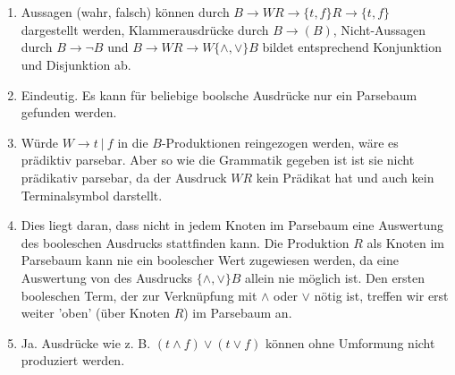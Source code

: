 \documentclass[a4paper,10pt]{scrartcl}
\begin{document}
\section{}
\begin{enumerate}
\item   Aussagen (wahr, falsch) können durch $B \to WR \to \{t,f\}R \to \{t,f\}$ dargestellt werden, Klammerausdrücke durch $B \to (B)$, Nicht-Aussagen durch $B \to \neg B$ und $B \to WR \to W\{\land,\lor\}B$ bildet entsprechend Konjunktion und Disjunktion ab.
\item   Eindeutig. Es kann für beliebige boolsche Ausdrücke nur ein Parsebaum gefunden werden.
\item   Würde $W \to t\ |\ f$ in die $B$-Produktionen reingezogen werden, wäre es prädiktiv parsebar. Aber so wie die Grammatik gegeben ist ist sie nicht prädikativ parsebar, da der Ausdruck $WR$ kein Prädikat hat und auch kein Terminalsymbol darstellt.
\item   Dies liegt daran, dass nicht in jedem Knoten im Parsebaum eine Auswertung des booleschen Ausdrucks stattfinden kann. Die Produktion $R$ als Knoten im Parsebaum kann nie ein boolescher Wert zugewiesen werden, da eine Auswertung von des Ausdrucks $\{\land,\lor\}B$ allein nie möglich ist. Den ersten booleschen Term, der zur Verknüpfung mit $\land$ oder $\lor$ nötig ist, treffen wir erst weiter 'oben' (über Knoten $R$) im Parsebaum an.
\item   Ja. Ausdrücke wie z. B. $(t \land f) \lor (t \lor f)$ können ohne Umformung nicht produziert werden.
\end{enumerate}
\end{document}
